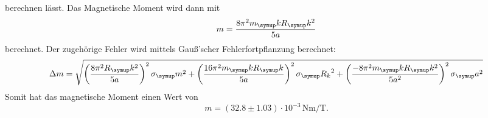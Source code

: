 berechnen lässt. Das Magnetische Moment wird dann mit
\begin{equation*}
  m = \frac{8\pi^2m_\su{k}R_\su{k}^2}{5a}
\end{equation*}
berechnet. Der zugehörige Fehler wird mittels Gauß'scher Fehlerfortpflanzung
berechnet:
\begin{equation*}
  \Delta m = \sqrt{\left(\frac{8\pi^2R_\su{k}^2}{5a}\right)^2\sigma_\su{m}^2 +
  \left(\frac{16\pi^2m_\su{k}R_\su{k}}{5a}\right)^2\sigma_\su{R_k}^2 +
  \left(\frac{-8\pi^2m_\su{k}R_\su{k}^2}{5a^2}\right)^2\sigma_\su{a}^2}
\end{equation*}
Somit hat das magnetische Moment einen Wert von
\begin{equation*}
  m = (32.8 \pm 1.03)\cdot10^{-3}\,\si{\newton\meter\per\tesla}.
\end{equation*}

